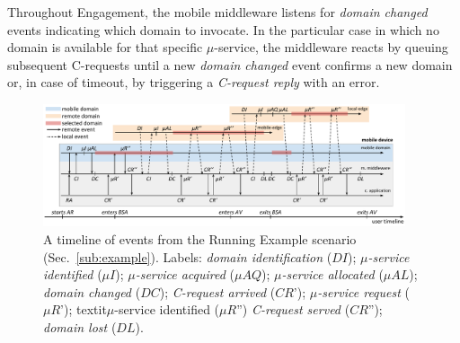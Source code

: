 Throughout Engagement, the mobile middleware listens for \textit{domain changed} events indicating which domain to invocate. In the particular case in which no domain is available for that specific $\mu$-service,
the middleware reacts by queuing subsequent C-requests until a new \textit{domain changed} event confirms a new domain or, in case of timeout, by triggering a \textit{C-request reply} with an error. 


\begin{figure}[tbp]
	\includegraphics[width=0.95\textwidth]{figs/A3-E-instance-events}
	\caption{A timeline of events from the Running Example scenario (Sec.~\ref{sub:example}). Labels: \textit{domain identification} ($DI$); \textit{$\mu$-service identified} ($\mu I$); \textit{$\mu$-service acquired} ($\mu AQ$); \textit{$\mu$-service allocated} ($\mu AL$); \textit{domain changed} ($DC$); \textit{C-request arrived} ($CR$'); \textit{$\mu$-service request} ($\mu R$'); textit{$\mu$-service identified} ($\mu R$'') \textit{C-request served} ($CR$''); \textit{domain lost} ($DL$).}
	\label{fig:A3-E-instance-events}
\end{figure}

